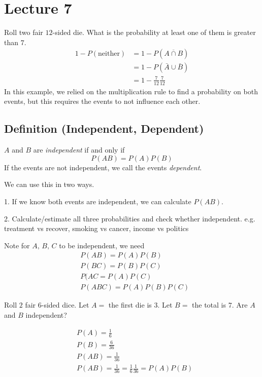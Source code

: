 \section{Lecture 7}
Roll two fair $ 12 $-sided die. What is the probability at least one of them
is greater than $ 7 $.
\begin{align*}
    1-P(\text{neither})&=1-P(\overline{A\cap B})\\
    &=1-P(\bar{A}\cup \bar{B})\\
    &=1-\frac{7}{12}\frac{7}{12}
\end{align*}
In this example, we relied on the multiplication rule to find a probability
on both events, but this requires the events to not influence each other.


\begin{defbox}
    \subsection{Definition (Independent, Dependent)}
    $ A $ and $ B $ are \emph{independent} if and only if
    \[ P(AB) =P(A)P(B)\]
    If the events are not independent, we call the events \emph{dependent}.
\end{defbox}
We can use this in two ways.

1. If we know both events are independent, we can calculate $ P(AB) $.

2. Calculate/estimate all three probabilities and check whether independent.
e.g. treatment vs recover, smoking vs cancer, income vs politics

Note for $ A,\,B,\,C $ to be independent, we need
\begin{align*}
    &P(AB)=P(A)P(B)\\
    &P(BC)=P(B)P(C)\\
    &P(AC=P(A)P(C)\\
    &P(ABC)=P(A)P(B)P(C)
\end{align*}

Roll $ 2 $ fair $ 6 $-sided dice. Let $ A=$ the first die is $ 3 $. Let
$ B= $ the total is $ 7 $. Are $ A $ and $ B $ independent?

\begin{align*}
    &P(A)=\frac{1}{6}\\
    &P(B)=\frac{6}{36}\\
    &P(AB)=\frac{1}{36}\\
    &P(AB)=\frac{1}{36}=\frac{1}{6} \frac{1}{36}=P(A)P(B)
\end{align*}

